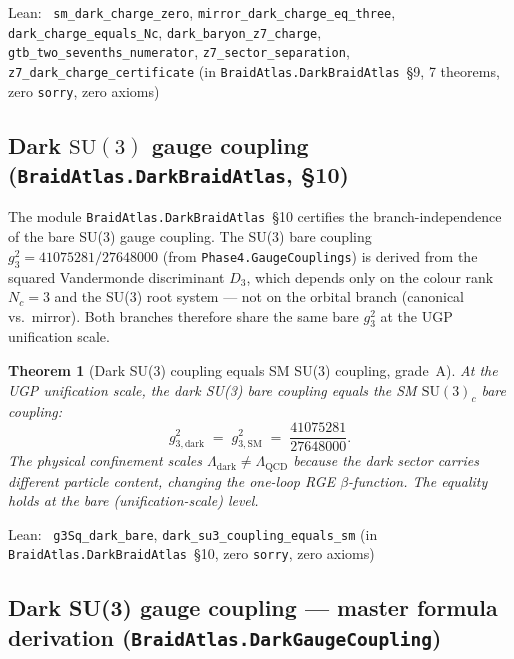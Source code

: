 \documentclass[11pt,a4paper]{article}
\newenvironment{leanref}%
  {\par\smallskip\noindent\begingroup\raggedright\textup{Lean:}~}%
  {\par\endgroup}
\newtheorem{theorem}{Theorem}[section]
\theoremstyle{definition}
\begin{document}
\begin{leanref}
\lstinline|sm_dark_charge_zero|,
\lstinline|mirror_dark_charge_eq_three|,
\lstinline|dark_charge_equals_Nc|,
\lstinline|dark_baryon_z7_charge|,
\lstinline|gtb_two_sevenths_numerator|,
\lstinline|z7_sector_separation|,
\lstinline|z7_dark_charge_certificate|
\textup{(in \texttt{BraidAtlas.DarkBraidAtlas}~\S9, 7 theorems, zero \texttt{sorry},
zero axioms)}
\end{leanref}

\subsection{Dark $\mathrm{SU}(3)$ gauge coupling
            (\texttt{BraidAtlas.DarkBraidAtlas}, \S10)}
\label{subsec:dark_gauge_coupling_lean}

The module \texttt{BraidAtlas.DarkBraidAtlas}~\S10 certifies the branch-independence
of the bare SU(3) gauge coupling.  The SU(3) bare coupling $g_3^2 =
41075281/27648000$ (from \texttt{Phase4.GaugeCouplings}) is derived from the
squared Vandermonde discriminant $D_3$, which depends only on the colour rank
$N_c = 3$ and the SU(3) root system — not on the orbital branch (canonical
vs.\ mirror).  Both branches therefore share the same bare $g_3^2$ at the UGP
unification scale.

\begin{theorem}[Dark SU(3) coupling equals SM SU(3) coupling, grade~A]\label{thm:dark_su3_coupling}
At the UGP unification scale, the dark SU(3) bare coupling equals the SM
$\mathrm{SU}(3)_c$ bare coupling:
\[
  g_{3,\mathrm{dark}}^2 \;=\; g_{3,\mathrm{SM}}^2 \;=\; \frac{41075281}{27648000}.
\]
The physical confinement scales $\Lambda_{\mathrm{dark}} \neq \Lambda_{\mathrm{QCD}}$
because the dark sector carries different particle content, changing the one-loop
RGE $\beta$-function.  The equality holds at the bare (unification-scale) level.
\end{theorem}

\begin{leanref}
\lstinline|g3Sq_dark_bare|,
\lstinline|dark_su3_coupling_equals_sm|
\textup{(in \texttt{BraidAtlas.DarkBraidAtlas}~\S10, zero \texttt{sorry},
zero axioms)}
\end{leanref}

\subsection{Dark SU(3) gauge coupling — master formula derivation
            (\texttt{BraidAtlas.DarkGaugeCoupling})}
\label{subsec:dark_gauge_coupling_master}
\end{document}
